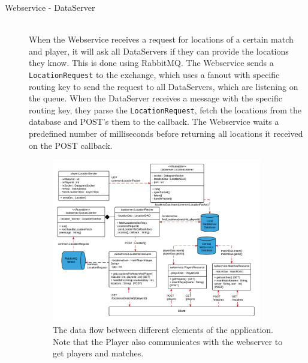 \begin{description}
\item[Webservice - DataServer] \hfill \\
When the Webservice receives a request for locations of a certain match and player, it will ask all DataServers if they can provide the locations they know. This is done using RabbitMQ. The Webservice sends a \texttt{LocationRequest} to the exchange, which uses a fanout with specific routing key to send the request to all DataServers, which are listening on the queue. When the DataServer receives a message with the specific routing key, they parse the \texttt{LocationRequest}, fetch the locations from the database and POST's them to the callback. The Webservice waits a predefined number of milliseconds before returning all locations it received on the POST callback.


\begin{figure}[h]
\centering
\includegraphics[width=0.9\textwidth]{img/dataflow.png}
\caption{The data flow between different elements of the application. Note that the Player also communicates with the webserver to get players and matches.}
\label{fig:dataflow}
\end{figure}

\end{description}